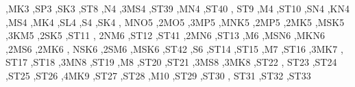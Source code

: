 \begin{DoxyCompactItemize}
\textquotesingle{},\textquotesingle{}\+M\+K3 \textquotesingle{},\textquotesingle{}\+S\+P3 \textquotesingle{},\textquotesingle{}\+S\+K3 \textquotesingle{},\textquotesingle{}\+S\+T8 \textquotesingle{},\textquotesingle{}\+N4 \textquotesingle{},\textquotesingle{}3\+M\+S4 \textquotesingle{},\textquotesingle{}\+S\+T39 \textquotesingle{},\textquotesingle{}\+M\+N4 \textquotesingle{},\textquotesingle{}\+S\+T40 \textquotesingle{}, \textquotesingle{}\+S\+T9 \textquotesingle{},\textquotesingle{}\+M4 \textquotesingle{},\textquotesingle{}\+S\+T10 \textquotesingle{},\textquotesingle{}\+S\+N4 \textquotesingle{},\textquotesingle{}\+K\+N4 \textquotesingle{},\textquotesingle{}\+M\+S4 \textquotesingle{},\textquotesingle{}\+M\+K4 \textquotesingle{},\textquotesingle{}\+S\+L4 \textquotesingle{},\textquotesingle{}\+S4 \textquotesingle{},\textquotesingle{}\+S\+K4 \textquotesingle{}, \textquotesingle{}\+M\+N\+O5 \textquotesingle{},\textquotesingle{}2\+M\+O5 \textquotesingle{},\textquotesingle{}3\+M\+P5 \textquotesingle{},\textquotesingle{}\+M\+N\+K5 \textquotesingle{},\textquotesingle{}2\+M\+P5 \textquotesingle{},\textquotesingle{}2\+M\+K5 \textquotesingle{},\textquotesingle{}\+M\+S\+K5 \textquotesingle{},\textquotesingle{}3\+K\+M5 \textquotesingle{},\textquotesingle{}2\+S\+K5 \textquotesingle{},\textquotesingle{}\+S\+T11 \textquotesingle{}, \textquotesingle{}2\+N\+M6 \textquotesingle{},\textquotesingle{}\+S\+T12 \textquotesingle{},\textquotesingle{}\+S\+T41 \textquotesingle{},\textquotesingle{}2\+M\+N6 \textquotesingle{},\textquotesingle{}\+S\+T13 \textquotesingle{},\textquotesingle{}\+M6 \textquotesingle{},\textquotesingle{}\+M\+S\+N6 \textquotesingle{},\textquotesingle{}\+M\+K\+N6 \textquotesingle{},\textquotesingle{}2\+M\+S6 \textquotesingle{},\textquotesingle{}2\+M\+K6 \textquotesingle{}, \textquotesingle{}\+N\+S\+K6 \textquotesingle{},\textquotesingle{}2\+S\+M6 \textquotesingle{},\textquotesingle{}\+M\+S\+K6 \textquotesingle{},\textquotesingle{}\+S\+T42 \textquotesingle{},\textquotesingle{}\+S6 \textquotesingle{},\textquotesingle{}\+S\+T14 \textquotesingle{},\textquotesingle{}\+S\+T15 \textquotesingle{},\textquotesingle{}\+M7 \textquotesingle{},\textquotesingle{}\+S\+T16 \textquotesingle{},\textquotesingle{}3\+M\+K7 \textquotesingle{}, \textquotesingle{}\+S\+T17 \textquotesingle{},\textquotesingle{}\+S\+T18 \textquotesingle{},\textquotesingle{}3\+M\+N8 \textquotesingle{},\textquotesingle{}\+S\+T19 \textquotesingle{},\textquotesingle{}\+M8 \textquotesingle{},\textquotesingle{}\+S\+T20 \textquotesingle{},\textquotesingle{}\+S\+T21 \textquotesingle{},\textquotesingle{}3\+M\+S8 \textquotesingle{},\textquotesingle{}3\+M\+K8 \textquotesingle{},\textquotesingle{}\+S\+T22 \textquotesingle{}, \textquotesingle{}\+S\+T23 \textquotesingle{},\textquotesingle{}\+S\+T24 \textquotesingle{},\textquotesingle{}\+S\+T25 \textquotesingle{},\textquotesingle{}\+S\+T26 \textquotesingle{},\textquotesingle{}4\+M\+K9 \textquotesingle{},\textquotesingle{}\+S\+T27 \textquotesingle{},\textquotesingle{}\+S\+T28 \textquotesingle{},\textquotesingle{}\+M10 \textquotesingle{},\textquotesingle{}\+S\+T29 \textquotesingle{},\textquotesingle{}\+S\+T30 \textquotesingle{}, \textquotesingle{}\+S\+T31 \textquotesingle{},\textquotesingle{}\+S\+T32 \textquotesingle{},\textquotesingle{}\+S\+T33 
\end{DoxyCompactItemize}
